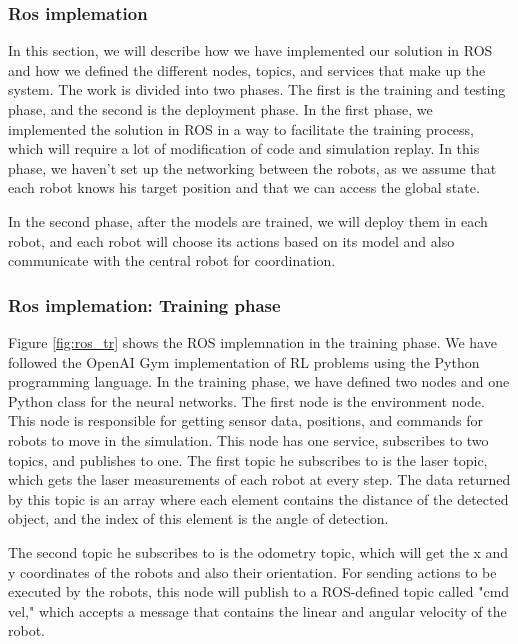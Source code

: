\documentclass[12pt]{extarticle}
\begin{document}
 
   











 

\subsubsection{Ros implemation}
In this section, we will describe how we have implemented our solution in ROS and how we defined the different nodes, topics, and services that make up the system.
The work is divided into two phases. The first is the training and testing phase, and the second is the deployment phase.
In the first phase, we implemented the solution in ROS in a way to facilitate the training process, which will require a lot of modification of code and simulation replay. In this phase, we haven't set up the networking between the robots, as we assume that each robot knows his target position and that we can access the global state.

In the second phase, after the models are trained, we will deploy them in each robot, and each robot will choose its actions based on its model and also communicate with the central robot for coordination.



\subsubsection{Ros implemation: Training phase}
Figure \ref{fig:ros_tr} shows the ROS implemnation in the training phase.
We have followed the OpenAI Gym implementation of RL problems using the Python programming language.
In the training phase, we have defined two nodes and one Python class for the neural networks.
The first node is the environment node. This node is responsible for getting sensor data, positions, and commands for robots to move in the simulation.
This node has one service, subscribes to two topics, and publishes to one. The first topic he subscribes to is the laser topic, which gets the laser measurements of each robot at every step. The data returned by this topic is an array where each element contains the distance of the detected object, and the index of this element is the angle of detection.

The second topic he subscribes to is the odometry topic, which will get the x and y coordinates of the robots and also their orientation. For sending actions to be executed by the robots, this node will publish to a ROS-defined topic called "cmd vel," which accepts a message that contains the linear and angular velocity of the robot.
\end{document}
